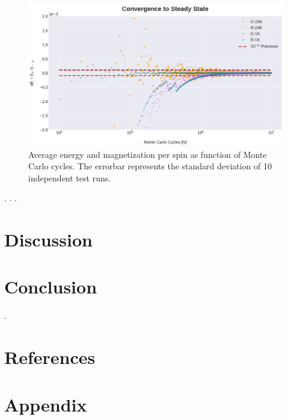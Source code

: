 \documentclass[%
reprint,nofootinbib,
amsmath,amssymb,
aps,
]{revtex4-1}
\begin{document}
\begin{figure} 
	\includegraphics[width = \textwidth]{Figures/Plot3.png} 
	\caption{\centering \label{4C1}Average energy and magnetization per spin as function of Monte Carlo cycles. The errorbar represents the standard deviation of 10 independent test runs.}
\end{figure}
\newpage.
\newpage.
\newpage.
\section{Discussion} \noindent 
\section{Conclusion} \noindent 
\newpage . \newpage
\onecolumngrid 
\section{References} \noindent
\newpage
\section{Appendix} \noindent
\end{document}
